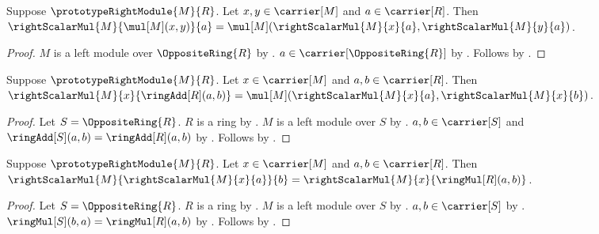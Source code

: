 \begin{proposition}\label{spike_right_scalar_vector_distributive}
    Suppose $\prototypeRightModule{M}{R}$.
    Let $x,y\in\carrier[M]$ and $a\in\carrier[R]$.
    Then
        $\rightScalarMul{M}{\mul[M](x,y)}{a}
            =\mul[M]
                (\rightScalarMul{M}{x}{a},
                 \rightScalarMul{M}{y}{a})$.
\end{proposition}
\begin{proof}
    $M$ is a left module over $\OppositeRing{R}$ by
        .
    $a\in\carrier[\OppositeRing{R}]$ by
        .
    Follows by
        .
\end{proof}

\begin{proposition}\label{spike_right_scalar_add_distributive}
    Suppose $\prototypeRightModule{M}{R}$.
    Let $x\in\carrier[M]$ and $a,b\in\carrier[R]$.
    Then
        $\rightScalarMul{M}{x}{\ringAdd[R](a,b)}
            =\mul[M]
                (\rightScalarMul{M}{x}{a},
                 \rightScalarMul{M}{x}{b})$.
\end{proposition}
\begin{proof}
    Let $S=\OppositeRing{R}$.
    $R$ is a ring by .
    $M$ is a left module over $S$ by
        .
    $a,b\in\carrier[S]$ and
        $\ringAdd[S](a,b)=\ringAdd[R](a,b)$ by
        .
    Follows by
        .
\end{proof}

\begin{proposition}\label{spike_right_scalar_associative}
    Suppose $\prototypeRightModule{M}{R}$.
    Let $x\in\carrier[M]$ and $a,b\in\carrier[R]$.
    Then
        $\rightScalarMul{M}{\rightScalarMul{M}{x}{a}}{b}
            =\rightScalarMul{M}{x}{\ringMul[R](a,b)}$.
\end{proposition}
\begin{proof}
    Let $S=\OppositeRing{R}$.
    $R$ is a ring by .
    $M$ is a left module over $S$ by
        .
    $a,b\in\carrier[S]$ by
        .
    $\ringMul[S](b,a)=\ringMul[R](a,b)$ by
        .
    Follows by
        .
\end{proof}

